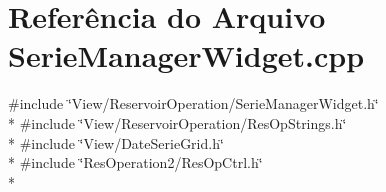 \section{Referência do Arquivo Serie\+Manager\+Widget.\+cpp}
\label{_serie_manager_widget_8cpp}
{\ttfamily \#include \char`\"{}View/\+Reservoir\+Operation/\+Serie\+Manager\+Widget.\+h\char`\"{}}\\*
{\ttfamily \#include \char`\"{}View/\+Reservoir\+Operation/\+Res\+Op\+Strings.\+h\char`\"{}}\\*
{\ttfamily \#include \char`\"{}View/\+Date\+Serie\+Grid.\+h\char`\"{}}\\*
{\ttfamily \#include \char`\"{}Res\+Operation2/\+Res\+Op\+Ctrl.\+h\char`\"{}}\\*
